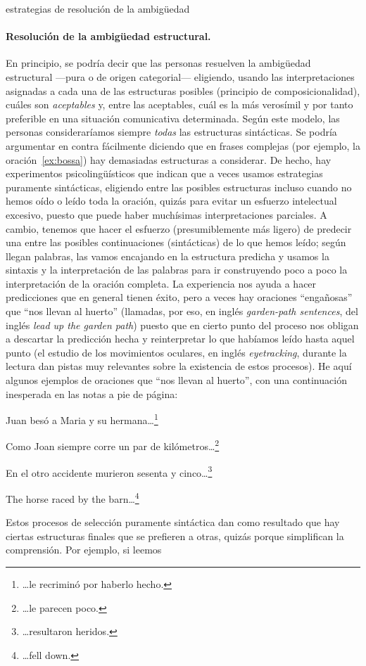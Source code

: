 \begin{persabermes}{estrategias de resolución de la ambigüedad}
\paragraph{Resolución de la ambigüedad estructural.} \label{s3:resambest} En principio, se podría decir que las personas resuelven la ambigüedad estructural ---pura o de origen categorial--- eligiendo, usando las interpretaciones asignadas a cada una de las estructuras posibles (principio de composicionalidad), cuáles son \emph{aceptables} y, entre las aceptables, cuál es la más verosímil y por tanto preferible en una situación comunicativa determinada. Según este modelo, las personas consideraríamos siempre \emph{todas} las estructuras sintácticas. Se podría argumentar en contra fácilmente diciendo que en frases complejas (por ejemplo, la oración~\ref{ex:bossa}) hay demasiadas estructuras a considerar. De hecho, hay experimentos psicolingüísticos que indican que a veces usamos estrategias puramente sintácticas, eligiendo entre las posibles estructuras incluso cuando no hemos oído o leído toda la oración, quizás para evitar un esfuerzo intelectual excesivo, puesto que puede haber muchísimas interpretaciones parciales. A cambio, tenemos que hacer el esfuerzo (presumiblemente más ligero) de predecir una entre las posibles continuaciones (sintácticas) de lo que hemos leído; según llegan palabras, las vamos encajando en la estructura predicha y usamos la sintaxis y la interpretación de las palabras para ir construyendo poco a poco la interpretación de la oración completa. La experiencia nos ayuda a hacer predicciones que en general tienen éxito, pero a veces hay oraciones ``engañosas'' que ``nos llevan al huerto'' (llamadas, por eso, en inglés \emph{garden-path sentences}, del inglés \emph{lead up the garden path}) puesto que en cierto punto del proceso nos obligan a descartar la predicción hecha y reinterpretar lo que habíamos leído hasta aquel punto (el estudio de los movimientos oculares, en inglés \emph{eyetracking}, durante la lectura dan pistas muy relevantes sobre la existencia de estos procesos). He aquí algunos ejemplos de oraciones que ``nos llevan al huerto'', con una continuación inesperada en las notas a pie de página: \begin{exemple} Juan besó a Maria y su hermana\ldots\footnote{\ldots le recriminó por haberlo hecho.} \end{exemple} \begin{exemple} Como Joan siempre corre un par de kilómetros\ldots\footnote{\ldots le parecen poco.} \end{exemple} \begin{exemple} En el otro accidente murieron sesenta y cinco\ldots\footnote{\ldots resultaron heridos.} \end{exemple} \begin{exemple} The horse raced by the barn\ldots\footnote{\ldots fell down.} \end{exemple} Estos procesos de selección puramente sintáctica dan como resultado que hay ciertas estructuras finales que se prefieren a otras, quizás porque simplifican la comprensión. Por ejemplo, si leemos 
\end{persabermes}
